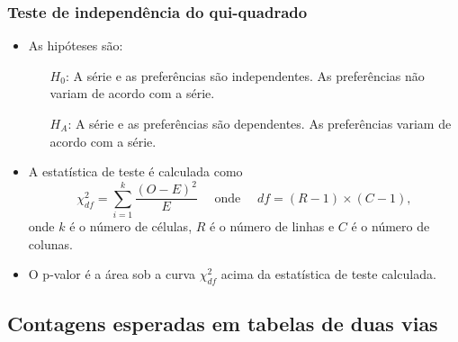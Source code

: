 
\begin{frame}
\frametitle{Teste de independência do qui-quadrado}

\begin{itemize}
\justifying
\item As hipóteses são:
\begin{itemize}
\justifying
\item[$H_0$:] A série e as preferências são independentes. As preferências não variam de acordo com a série.
\justifying
\item[$H_A$:] A série e as preferências são dependentes. As preferências variam de acordo com a série.
\end{itemize}

\pause
\justifying
\item A estatística de teste é calculada como
\[ \chi^2_{df} = \sum_{i = 1}^{k} \frac{(O - E)^2}{E} \quad \text{ onde } \quad df = (R - 1) \times (C - 1), \]
onde $k$ é o número de células, $ R $ é o número de linhas e $ C $ é o número de colunas.\\

\pause
\justifying
\item O p-valor é a área sob a curva $\chi^2_{df}$ acima da estatística de teste calculada.


\justifying
\tiny{}



\end{itemize}


\end{frame}


\subsection{Contagens esperadas em tabelas de duas vias}


